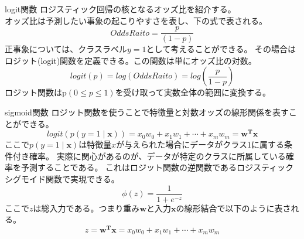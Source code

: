 \documentclass[aspectratio=169, dvipdfmx, 11pt]{beamer} %
\begin{document}
\begin{frame}{logit関数}
    ロジスティック回帰の核となるオッズ比を紹介する。\\
    オッズ比は予測したい事象の起こりやすさを表し、下の式で表される。
    \begin{equation*}
        Odds Raito = \frac{p}{(1-p)}
    \end{equation*}
    正事象については、クラスラベル\(y=1\)として考えることができる。
    その場合はロジット(logit)関数を定義できる。この関数は単にオッズ比の対数。
    \begin{equation*}
        logit(p) = log(OddsRaito) = log(\frac{p}{1-p})
    \end{equation*}
    ロジット関数はp\((0\leq p \leq 1)\)を受け取って実数全体の範囲に変換する。
\end{frame} 

\begin{frame}{sigmoid関数}
    ロジット関数を使うことで特徴量と対数オッズの線形関係を表すことができる。
    \begin{equation*}
        logit(p(y=1 \mid \textbf{x})) = x_0w_0 + x_1w_1 + \cdots  + x_mw_m = \mathbf{w^T}\mathbf{x}
    \end{equation*}
    ここで\(p(y=1 \mid \textbf{x})\)は特徴量\(x\)が与えられた場合にデータがクラス1に属する条件付き確率。
    実際に関心があるのが、データが特定のクラスに所属している確率を予測することである。
    これはロジット関数の逆関数であるロジスティックシグモイド関数で実現できる。
    \begin{equation*}
        \phi(z) = \frac{1}{1+e^{-z}}
    \end{equation*}
    ここで\(z\)は総入力である。つまり重み\(\textbf{w}\)と入力\(\textbf{x}\)の線形結合で以下のように表される。
    \begin{equation*}
        z = \mathbf{w^T}\mathbf{x} = x_0w_0 + x_1w_1 + \cdots  + x_mw_m
    \end{equation*}
\end{frame}
\end{document}
